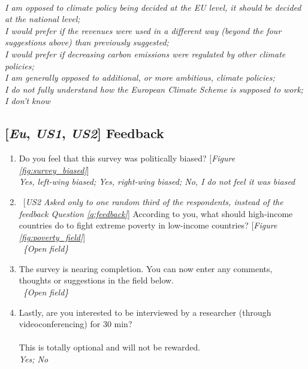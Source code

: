 \begin{enumerate}[resume]
    \\ \textit{I am opposed to climate policy being decided at the EU level, it should be decided at the national level; \\I would prefer if the revenues were used in a different way (beyond the four suggestions above) than previously suggested; \\I would prefer if decreasing carbon emissions were regulated by other climate policies; \\I am generally opposed to additional, or more ambitious, climate policies; \\I do not fully understand how the European Climate Scheme is supposed to work; \\I don't know}
\end{enumerate}

\subsection*{[\textit{Eu}, \textit{US1}, \textit{US2}] Feedback}
\begin{enumerate}[resume]
\item \label{q:survey_biased} Do you feel that this survey was politically biased? [\textit{Figure \ref{fig:survey_biased}}]
\\ \textit{Yes, left-wing biased; Yes, right-wing biased; No, I do not feel it was biased}
\item \label{q:poverty_field} ~[\textit{US2} \textit{Asked only to one random third of the respondents, instead of the feedback Question \ref{q:feedback}}] According to you, what should high-income countries do to fight extreme poverty in low-income countries? [\textit{Figure \ref{fig:poverty_field}}]
\\ ~\textit{\{Open field\}}
\item \label{q:feedback} The survey is nearing completion. You can now enter any comments, thoughts or suggestions in the field below.
\\ ~\textit{\{Open field\}}
\item Lastly, are you interested to be interviewed by a researcher (through videoconferencing) for 30 min? \\
\\
This is totally optional and will not be rewarded.
\\ \textit{Yes; No}
\end{enumerate}
